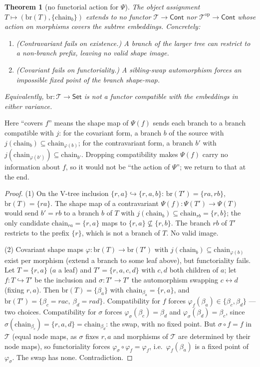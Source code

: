 \documentclass[11pt]{article}
\newtheorem{theorem}{Theorem}
\theoremstyle{definition}
\newcommand{\Set}{\mathsf{Set}}
\newcommand{\Cont}{\mathsf{Cont}}
\newcommand{\branches}{\mathrm{br}}
\newcommand{\op}{\mathrm{op}}
\newcommand{\Tree}{\mathcal{T}}
\newcommand{\inpr}{\hookrightarrow}
\begin{document}
\begin{theorem}[no functorial action for $\Psi$]\label{thm:nogo}
The object assignment $T\mapsto(\branches(T),\{\mathrm{chain}_b\})$ extends to \emph{no} functor
$\Tree\to\Cont$ nor $\Tree^\op\to\Cont$ whose action on morphisms covers the subtree embeddings.
Concretely:
\begin{enumerate}
\item \textup{(Contravariant fails on existence.)} A branch of the larger tree can restrict to a
non-branch prefix, leaving no valid shape image.
\item \textup{(Covariant fails on functoriality.)} A sibling-swap automorphism forces an impossible
fixed point of the branch shape-map.
\end{enumerate}
Equivalently, $\branches\colon\Tree\to\Set$ is not a functor compatible with the embeddings in
either variance.
\end{theorem}

Here ``covers $f$'' means the shape map of $\Psi(f)$ sends each branch to a branch compatible with
$j$: for the covariant form, a branch $b$ of the source with $j(\mathrm{chain}_b)\subseteq
\mathrm{chain}_{\varphi(b)}$; for the contravariant form, a branch $b'$ with
$j(\mathrm{chain}_{\varphi(b')})\subseteq\mathrm{chain}_{b'}$. Dropping compatibility makes $\Psi(f)$
carry no information about $f$, so it would not be ``the action of $\Psi$''; we return to that at the
end.

\begin{proof}
(1) On the V-tree inclusion $\{r,a\}\inpr\{r,a,b\}$: $\branches(T')=\{ra,rb\}$,
$\branches(T)=\{ra\}$. The shape map of a contravariant $\Psi(f)\colon\Psi(T')\to\Psi(T)$ would send
$b'=rb$ to a branch $b$ of $T$ with $j(\mathrm{chain}_b)\subseteq\mathrm{chain}_{rb}=\{r,b\}$; the
only candidate $\mathrm{chain}_{ra}=\{r,a\}$ maps to $\{r,a\}\not\subseteq\{r,b\}$. The branch $rb$
of $T'$ restricts to the prefix $\{r\}$, which is not a branch of $T$. No valid image.

(2) Covariant shape maps $\varphi\colon\branches(T)\to\branches(T')$ with
$j(\mathrm{chain}_b)\subseteq\mathrm{chain}_{\varphi(b)}$ exist per morphism (extend a branch to some
leaf above), but functoriality fails. Let $T=\{r,a\}$ ($a$ a leaf) and $T'=\{r,a,c,d\}$ with $c,d$
both children of $a$; let $f\colon T\inpr T'$ be the inclusion and $\sigma\colon T'\to T'$ the
automorphism swapping $c\leftrightarrow d$ (fixing $r,a$). Then $\branches(T)=\{\beta_a\}$ with
$\mathrm{chain}_{\beta_a}=\{r,a\}$, and $\branches(T')=\{\beta_c=rac,\ \beta_d=rad\}$.
Compatibility for $f$ forces $\varphi_f(\beta_a)\in\{\beta_c,\beta_d\}$ --- two choices.
Compatibility for $\sigma$ forces $\varphi_\sigma(\beta_c)=\beta_d$ and $\varphi_\sigma(\beta_d)=
\beta_c$, since $\sigma(\mathrm{chain}_{\beta_c})=\{r,a,d\}=\mathrm{chain}_{\beta_d}$: the swap, with
no fixed point. But $\sigma\circ f=f$ in $\Tree$ (equal node maps, as $\sigma$ fixes $r,a$ and
morphisms of $\Tree$ are determined by their node maps), so functoriality forces
$\varphi_\sigma\circ\varphi_f=\varphi_f$, i.e.\ $\varphi_f(\beta_a)$ is a fixed point of
$\varphi_\sigma$. The swap has none. Contradiction.
\end{proof}
\end{document}
